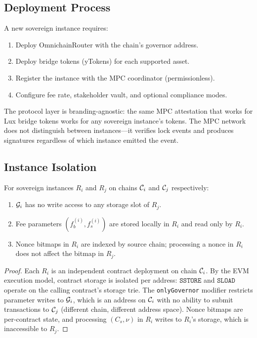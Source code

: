 \subsection{Deployment Process}

A new sovereign instance requires:

\begin{enumerate}[nosep]
  \item Deploy OmnichainRouter with the chain's governor address.
  \item Deploy bridge tokens (yTokens) for each supported asset.
  \item Register the instance with the MPC coordinator (permissionless).
  \item Configure fee rate, stakeholder vault, and optional compliance modes.
\end{enumerate}

The protocol layer is branding-agnostic: the same MPC attestation that works for Lux bridge tokens works for any sovereign instance's tokens. The MPC network does not distinguish between instances---it verifies lock events and produces signatures regardless of which instance emitted the event.

\subsection{Instance Isolation}

\begin{theorem}
\label{thm:instance}
For sovereign instances $R_i$ and $R_j$ on chains $\mathcal{C}_i$ and $\mathcal{C}_j$ respectively:
\begin{enumerate}[nosep]
  \item $\mathcal{G}_i$ has no write access to any storage slot of $R_j$.
  \item Fee parameters $(f_b^{(i)}, f_s^{(i)})$ are stored locally in $R_i$ and read only by $R_i$.
  \item Nonce bitmaps in $R_i$ are indexed by source chain; processing a nonce in $R_i$ does not affect the bitmap in $R_j$.
\end{enumerate}
\end{theorem}

\begin{proof}
Each $R_i$ is an independent contract deployment on chain $\mathcal{C}_i$. By the EVM execution model, contract storage is isolated per address: $\texttt{SSTORE}$ and $\texttt{SLOAD}$ operate on the calling contract's storage trie. The \texttt{onlyGovernor} modifier restricts parameter writes to $\mathcal{G}_i$, which is an address on $\mathcal{C}_i$ with no ability to submit transactions to $\mathcal{C}_j$ (different chain, different address space). Nonce bitmaps are per-contract state, and processing $(C_s, \nu)$ in $R_i$ writes to $R_i$'s storage, which is inaccessible to $R_j$.
\end{proof}

